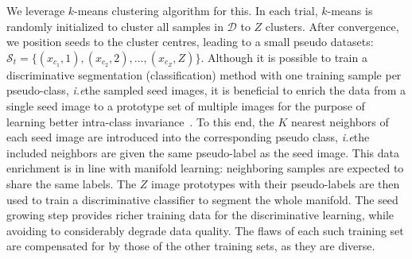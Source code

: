 \documentclass{bmvc2k}
\def\ie{\emph{i.e}\bmvaOneDot}
\begin{document}

We leverage $k$-means clustering algorithm for this. In each trial, $k$-means is randomly initialized to cluster all samples in $\mathcal{D}$ to $Z$ clusters. After convergence, we position seeds to the cluster centres, leading to a small pseudo datasets: $\mathcal{S}_t=\{(x_{c_1},1), (x_{c_2},2), ..., (x_{c_Z}, Z)\}$. 
Although it is possible to train a discriminative
segmentation (classification) method with one training sample per
pseudo-class, \ie the sampled seed images, it is beneficial to enrich
the data from a single seed image to a prototype set of multiple images 
for the purpose of learning better intra-class
invariance~\cite{singh2012unsupervised,dai:ensemble:eccv12,DFB16}. To this end, the $K$
nearest neighbors of each seed image are introduced into the
corresponding pseudo class, \ie the included neighbors are given the
same pseudo-label as the seed image. This data enrichment is in line
with manifold learning: neighboring samples are expected to
share the same labels. The $Z$ image prototypes with their pseudo-labels
are then used to train a discriminative classifier to segment the
whole manifold. The seed growing step provides richer
training data for the discriminative learning, while avoiding to
considerably degrade data quality. The flaws of each such training
set are compensated for by those of the other training sets, as 
they are diverse.
\end{document}
